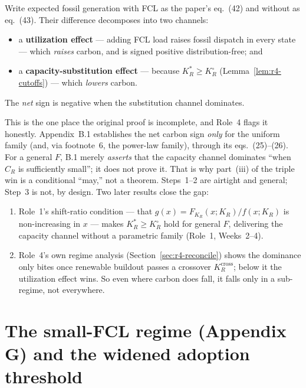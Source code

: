 \begin{proposition}
\label{prop:r4-step3}
Write expected fossil generation with FCL as the paper's eq.~(42) and without as
eq.~(43). Their difference decomposes into two channels:
\begin{itemize}
\item a \textbf{utilization effect} --- adding FCL load raises fossil dispatch in
every state --- which \emph{raises} carbon, and is signed positive
distribution-free; and
\item a \textbf{capacity-substitution effect} --- because $K_R^*\ge K_R^\circ$
(Lemma~\ref{lem:r4-cutoffs}) --- which \emph{lowers} carbon.
\end{itemize}
The \emph{net} sign is negative when the substitution channel dominates.
\end{proposition}

\begin{remark}
\label{rem:r4-gap}
This is the one place the original proof is incomplete, and Role~4 flags it honestly.
Appendix~B.1 establishes the net carbon sign \emph{only} for the uniform family (and,
via footnote~6, the power-law family), through its eqs.~(25)--(26). For a general $F$,
B.1 merely \emph{asserts} that the capacity channel dominates ``when $C_R$ is
sufficiently small''; it does not prove it. That is why part~(iii) of the triple win is
a conditional ``may,'' not a theorem. Steps~1--2 are airtight and general; Step~3 is
not, by design. Two later results close the gap:
\begin{enumerate}
\item[(a)] Role~1's shift-ratio condition --- that $g(x)=F_{K_R}(x;K_R)/f(x;K_R)$ is
non-increasing in $x$ --- makes $K_R^*\ge K_R^\circ$ hold for general $F$, delivering
the capacity channel without a parametric family (Role~1, Weeks~2--4).
\item[(b)] Role~4's own regime analysis (Section~\ref{sec:r4-reconcile}) shows the
dominance only bites once renewable buildout passes a crossover $K_R^{\mathrm{cross}}$;
below it the utilization effect wins. So even where carbon does fall, it falls only
in a sub-regime, not everywhere.
\end{enumerate}
\end{remark}

\section{The small-FCL regime (Appendix G) and the widened adoption threshold}
\label{sec:r4-smallfcl}

